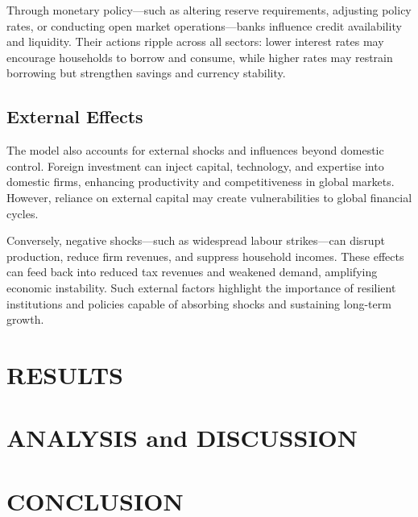 \documentclass[10pt,onecolumn]{witseiepaper}
\begin{document}
Through monetary policy—such as altering reserve requirements, adjusting policy rates, or conducting open market operations—banks influence credit availability and liquidity. Their actions ripple across all sectors: lower interest rates may encourage households to borrow and consume, while higher rates may restrain borrowing but strengthen savings and currency stability.

\subsection{External Effects}
The model also accounts for external shocks and influences beyond domestic control. Foreign investment can inject capital, technology, and expertise into domestic firms, enhancing productivity and competitiveness in global markets. However, reliance on external capital may create vulnerabilities to global financial cycles.  

Conversely, negative shocks—such as widespread labour strikes—can disrupt production, reduce firm revenues, and suppress household incomes. These effects can feed back into reduced tax revenues and weakened demand, amplifying economic instability. Such external factors highlight the importance of resilient institutions and policies capable of absorbing shocks and sustaining long-term growth.

\section{RESULTS}

\section{ANALYSIS and DISCUSSION}

\section{CONCLUSION}


%



\end{document}
